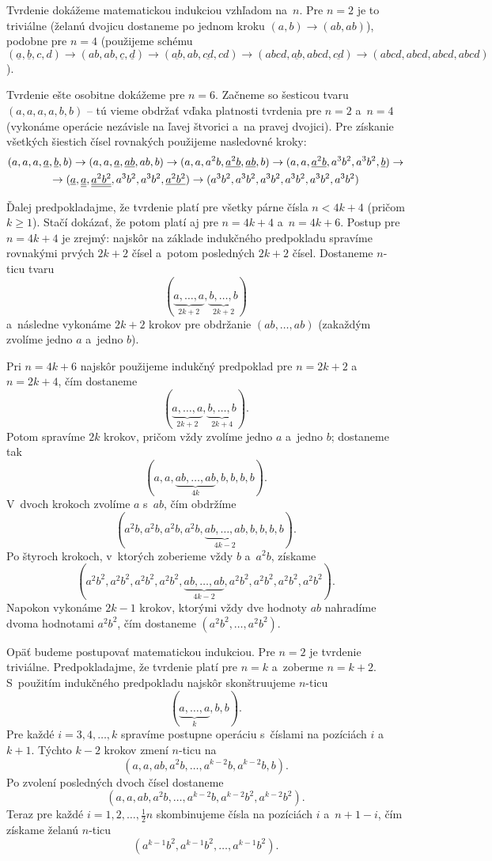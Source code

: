{%
\def\u#1{\underline{#1}}%
\def\U#1{\underline{\underline{#1}}}%
Tvrdenie dokážeme matematickou indukciou vzhľadom na~$n$. Pre ${n=2}$ je to triviálne (želanú dvojicu dostaneme po jednom kroku $(a,b)\to(ab,ab)$), podobne pre $n=4$ (použijeme schému $(\u a,\u b,c,d)\to(ab,ab,\u c,\u d)\to(\u{ab},ab,\u{cd},cd)\to(abcd,\u{ab},abcd,\u{cd})\to(abcd,abcd,abcd,abcd)$).

Tvrdenie ešte osobitne dokážeme pre $n=6$. Začneme so šesticou tvaru $(a,a,a,a,b,b)$ -- tú vieme obdržať vďaka platnosti tvrdenia pre $n=2$ a~$n=4$ (vykonáme operácie nezávisle na ľavej štvorici a~na pravej dvojici). Pre získanie všetkých šiestich čísel rovnakých použijeme nasledovné kroky:
$$
\gathered
(a,a,a,\u a,\u b,b)\to
(a,a,\u a,\u{ab},ab,b)\to
(a,a,a^2b,\u{a^2b},\u{ab},b)\to
(a,a,\u{a^2b},a^3b^2,a^3b^2,\u b)\to\\
\to(\u a,\U a,\U{a^2b^2},a^3b^2,a^3b^2,\u{a^2b^2})\to
(a^3b^2,a^3b^2,a^3b^2,a^3b^2,a^3b^2,a^3b^2)
\endgathered
$$

Ďalej predpokladajme, že tvrdenie platí pre všetky párne čísla $n<4k+4$ (pričom $k\ge1$). Stačí dokázať, že potom platí aj pre $n=4k+4$ a~$n=4k+6$. Postup pre $n=4k+4$ je zrejmý: najskôr na základe indukčného predpokladu spravíme rovnakými prvých $2k+2$ čísel a~potom posledných $2k+2$ čísel. Dostaneme $n$-ticu tvaru
$$
(\underbrace{a,\dots,a}_{2k+2},\underbrace{b,\dots,b}_{2k+2})
$$
a~následne vykonáme $2k+2$ krokov pre obdržanie $(ab,\dots,ab)$ (zakaždým zvolíme jedno $a$ a~jedno $b$).

Pri $n=4k+6$ najskôr použijeme indukčný predpoklad pre $n=2k+2$ a~$n=2k+4$, čím dostaneme
$$
(\underbrace{a,\dots,a}_{2k+2},\underbrace{b,\dots,b}_{2k+4}).
$$
Potom spravíme $2k$ krokov, pričom vždy zvolíme jedno $a$ a~jedno $b$; dostaneme tak
$$
(a,a,\underbrace{ab,\dots,ab}_{4k},b,b,b,b).
$$
V~dvoch krokoch zvolíme $a$ s~$ab$, čím obdržíme
$$
(a^2b,a^2b,a^2b,a^2b,\underbrace{ab,\dots,ab}_{4k-2},b,b,b,b).
$$
Po štyroch krokoch, v~ktorých zoberieme vždy $b$ a~$a^2b$, získame
$$
(a^2b^2,a^2b^2,a^2b^2,a^2b^2,\underbrace{ab,\dots,ab}_{4k-2},a^2b^2,a^2b^2,a^2b^2,a^2b^2).
$$
Napokon vykonáme $2k-1$ krokov, ktorými vždy dve hodnoty $ab$ nahradíme dvoma hodnotami $a^2b^2$, čím dostaneme $(a^2b^2,\dots,a^2b^2)$.

\ineriesenie
{}
Opäť budeme postupovať matematickou indukciou. Pre $n=2$ je tvrdenie triviálne. Predpokladajme, že tvrdenie platí pre $n=k$ a~zoberme $n=k+2$. S~použitím indukčného predpokladu najskôr skonštruujeme $n$-ticu
$$
(\underbrace{a,\dots,a}_{k},b,b).
$$
Pre každé $i=3,4,\dots,k$ spravíme postupne operáciu s~číslami na pozíciách $i$ a~$k+1$. Týchto $k-2$ krokov zmení $n$-ticu na
$$
(a,a,ab,a^2b,\dots,a^{k-2}b,a^{k-2}b,b).
$$
Po zvolení posledných dvoch čísel dostaneme
$$
(a,a,ab,a^2b,\dots,a^{k-2}b,a^{k-2}b^2,a^{k-2}b^2).
$$
Teraz pre každé $i=1,2,\dots,\frac12n$ skombinujeme čísla na pozíciách $i$ a~$n+1-i$, čím získame želanú $n$-ticu
$$
(a^{k-1}b^2,a^{k-1}b^2,\dots,a^{k-1}b^2).
$$

}
